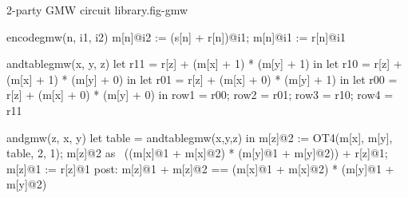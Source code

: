 \begin{fpfig}[t]{2-party GMW circuit library.}{fig-gmw}
{\footnotesize
  \begin{verbatimtab}
encodegmw(n, i1, i2) {
    m[n]@i2 := (s[n] + r[n])@i1;
    m[n]@i1 := r[n]@i1
}

andtablegmw(x, y, z) {
    let r11 = r[z] + (m[x] + 1) * (m[y] + 1) in
    let r10 = r[z] + (m[x] + 1) * (m[y] + 0) in
    let r01 = r[z] + (m[x] + 0) * (m[y] + 1) in
    let r00 = r[z] + (m[x] + 0) * (m[y] + 0) in
    { row1 = r00; row2 = r01; row3 = r10; row4 = r11 }
}

andgmw(z, x, y) {
   let table = andtablegmw(x,y,z) in
   m[z]@2 := OT4(m[x], m[y], table, 2, 1);
   m[z]@2 as ~((m[x]@1 + m[x]@2) * (m[y]@1 + m[y]@2)) + r[z]@1;
   m[z]@1 := r[z]@1
}
post:
{  m[z]@1 + m[z]@2 == (m[x]@1 + m[x]@2) * (m[y]@1 + m[y]@2) }
\end{verbatimtab}
}
\end{fpfig}


\begin{comment}
xorgmw(z, x, y) {
        m[z]@1 := (m[x] + m[y])@1; m[z]@2 := (m[x] + m[y])@2
}

decodegmw(z) {
        p["1"] := m[z]@1; p["2"] := m[z]@2;
        out@1 := (p["1"] + p["2"])@1;
        out@2 := (p["1"] + p["2"])@2
}
\end{comment}

